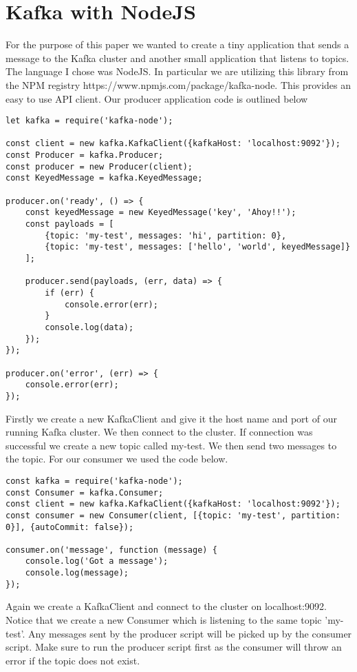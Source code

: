 \section{Kafka with NodeJS}

For the purpose of this paper we wanted to create a tiny application that sends a message to the Kafka cluster and another small application that listens to topics. The language I chose was NodeJS. In particular we are utilizing this library from the NPM registry https://www.npmjs.com/package/kafka-node. This provides an easy to use API client. Our producer application code is outlined below

\begin{verbatim}
let kafka = require('kafka-node');

const client = new kafka.KafkaClient({kafkaHost: 'localhost:9092'});
const Producer = kafka.Producer;
const producer = new Producer(client);
const KeyedMessage = kafka.KeyedMessage;

producer.on('ready', () => {
    const keyedMessage = new KeyedMessage('key', 'Ahoy!!');
    const payloads = [
        {topic: 'my-test', messages: 'hi', partition: 0},
        {topic: 'my-test', messages: ['hello', 'world', keyedMessage]}
    ];

    producer.send(payloads, (err, data) => {
        if (err) {
            console.error(err);
        }
        console.log(data);
    });
});

producer.on('error', (err) => {
    console.error(err);
});
\end{verbatim}

Firstly we create a new KafkaClient and give it the host name and port of our running Kafka cluster. We then connect to the cluster. If connection was successful we create a new topic called my-test. We then send two messages to the topic. For our consumer we used the code below.

\begin{verbatim}
const kafka = require('kafka-node');
const Consumer = kafka.Consumer;
const client = new kafka.KafkaClient({kafkaHost: 'localhost:9092'});
const consumer = new Consumer(client, [{topic: 'my-test', partition: 0}], {autoCommit: false});

consumer.on('message', function (message) {
    console.log('Got a message');
    console.log(message);
});
\end{verbatim}

Again we create a KafkaClient and connect to the cluster on localhost:9092. Notice that we  create a new Consumer which is listening to the same topic 'my-test'. Any messages sent by the producer script will be picked up by the consumer script. Make sure to run the producer script first as the consumer will throw an error if the topic does not exist.